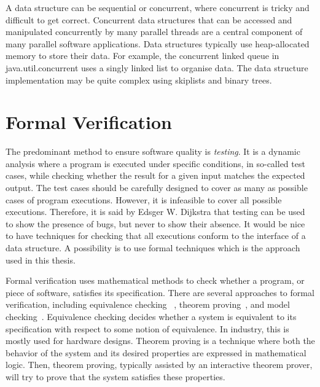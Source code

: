A data structure can be sequential or concurrent, where concurrent is tricky and difficult to get correct. Concurrent data structures that can be accessed and manipulated concurrently by many parallel threads are a central component of many parallel software applications. Data structures typically use heap-allocated memory to store their data. For example, the concurrent linked queue in java.util.concurrent uses a singly linked list to organise data. The data structure implementation may be quite complex using skiplists and binary trees.




\section{Formal Verification} 
The predominant method to ensure software quality is
\emph{testing}. It is a dynamic analysis where a program is executed under specific conditions, in so-called test cases, while checking whether the result for a given input matches the expected output.
%
The test cases should be carefully designed to cover as many as possible cases of program executions.
However, it is infeasible to cover all possible executions. Therefore, it is said by Edsger W. Dijkstra that testing can be used to show the presence of bugs, but never to show their absence. 
It would be nice to have techniques for checking that all executions conform to the interface of a data structure.
A possibility is to use formal techniques which is the approach used in this thesis.

Formal verification uses mathematical methods to check whether a program, or piece of software, satisfies its specification. 
There are several approaches to formal verification, including equivalence checking ~\cite{kuehlmann2002combinational}, theorem proving~\cite{rushby2000theorem}, and model checking~\cite{clarke1997model}. Equivalence checking decides whether a system is equivalent to its specification with respect to some notion of equivalence. In industry, this is mostly used for hardware designs. Theorem proving is a technique where both the behavior of the system and its desired properties are expressed in mathematical logic. Then, theorem proving, typically assisted by an interactive theorem prover, will try to prove that the system satisfies these properties. 

